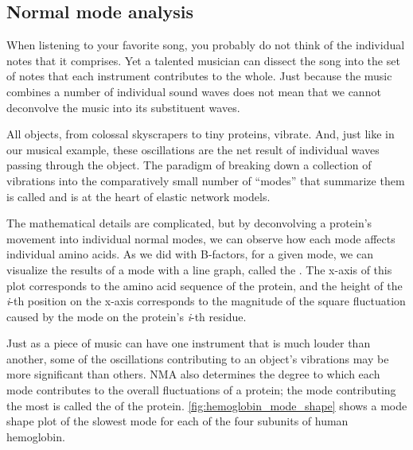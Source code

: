 \FloatBarrier
{}
\subsection{Normal mode analysis}

When listening to your favorite song, you probably do not think of the individual notes that it comprises. Yet a talented musician can dissect the song into the set of notes that each instrument contributes to the whole. Just because the music combines a number of individual sound waves does not mean that we cannot deconvolve the music into its substituent waves.

All objects, from colossal skyscrapers to tiny proteins, vibrate. And, just like in our musical example, these oscillations are the net result of individual waves passing through the object. The paradigm of breaking down a collection of vibrations into the comparatively small number of ``modes'' that summarize them is called  and is at the heart of elastic network models.

The mathematical details are complicated, but by deconvolving a protein's movement into individual normal modes, we can observe how each mode affects individual amino acids. As we did with B-factors, for a given mode, we can visualize the results of a mode with a line graph, called the . The x-axis of this plot corresponds to the amino acid sequence of the protein, and the height of the \textit{i}-th position on the x-axis corresponds to the magnitude of the square fluctuation caused by the mode on the protein's \textit{i}-th residue.

Just as a piece of music can have one instrument that is much louder than another, some of the oscillations contributing to an object's vibrations may be more significant than others. NMA also determines the degree to which each mode contributes to the overall fluctuations of a protein; the mode contributing the most is called the  of the protein. \autoref{fig:hemoglobin_mode_shape} shows a mode shape plot of the slowest mode for each of the four subunits of human hemoglobin.

